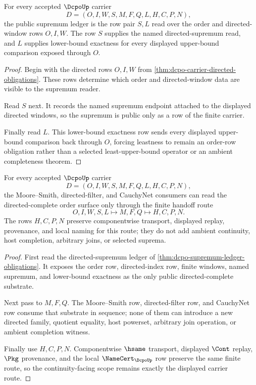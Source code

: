 \begin{theorem}
\label{thm:dcpo-supremum-ledger-obligations}
For every accepted $\DcpoUp$ carrier
$$
D=(O,I,W,S,M,F,Q,L,H,C,P,N),
$$
the public supremum ledger is the row pair $S,L$ read over the order and
directed-window rows $O,I,W$. The row $S$ supplies the named directed-supremum
read, and $L$ supplies lower-bound exactness for every displayed upper-bound
comparison exposed through $O$.
\end{theorem}
\begin{proof}
Begin with the directed rows $O,I,W$ from
\autoref{thm:dcpo-carrier-directed-obligations}. These rows determine which
order and directed-window data are visible to the supremum reader.

Read $S$ next. It records the named supremum endpoint attached to the displayed
directed windows, so the supremum is public only as a row of the finite carrier.

Finally read $L$. This lower-bound exactness row sends every displayed
upper-bound comparison back through $O$, forcing leastness to remain an
order-row obligation rather than a selected least-upper-bound operator or an
ambient completeness theorem.
\end{proof}

\begin{theorem}
\label{thm:dcpo-continuity-scope-obligations}
For every accepted $\DcpoUp$ carrier
$$
D=(O,I,W,S,M,F,Q,L,H,C,P,N),
$$
the Moore--Smith, directed-filter, and CauchyNet consumers can read the
directed-complete order surface only through the finite handoff route
$$
O,I,W,S,L \longmapsto M,F,Q \longmapsto H,C,P,N .
$$
The rows $H,C,P,N$ preserve componentwise transport, displayed replay,
provenance, and local naming for this route; they do not add ambient continuity,
host completion, arbitrary joins, or selected suprema.
\end{theorem}
\begin{proof}
First read the directed-supremum ledger of
\autoref{thm:dcpo-supremum-ledger-obligations}. It exposes the order row,
directed-index row, finite windows, named supremum, and lower-bound exactness
as the only public directed-complete substrate.

Next pass to $M,F,Q$. The Moore--Smith row, directed-filter row, and CauchyNet
row consume that substrate in sequence; none of them can introduce a new
directed family, quotient equality, host powerset, arbitrary join operation, or
ambient completion witness.

Finally use $H,C,P,N$. Componentwise $\hsame$ transport, displayed $\Cont$
replay, $\Pkg$ provenance, and the local $\NameCert_{\DcpoUp}$ row preserve the
same finite route, so the continuity-facing scope remains exactly the displayed
carrier route.
\end{proof}


